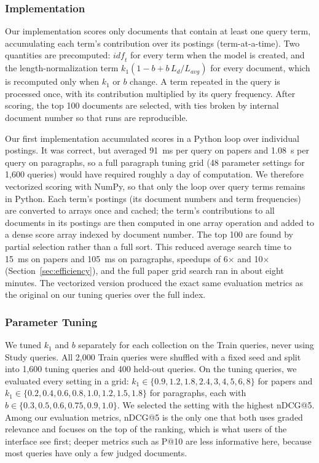 \documentclass[sigconf,nonacm]{acmart}
\begin{document}
\subsubsection{Implementation}
Our implementation scores only documents that contain at least one query term,
accumulating each term's contribution over its postings (term-at-a-time). Two
quantities are precomputed: $\mathit{idf}_t$ for every term when the model is 
created, and the length-normalization term $k_1(1 - b + b\,L_d/L_{\mathit{avg}})$
for every document, which is recomputed only when $k_1$ or $b$ change. A term 
repeated in the query is processed once, with its contribution multiplied by its 
query frequency. After scoring, the top 100 documents are selected, with ties broken
by internal document number so that runs are reproducible.

Our first implementation accumulated scores in a Python loop over individual postings. 
It was correct, but averaged 91~ms per query on papers and 1.08~s per query on paragraphs, 
so a full paragraph tuning grid (48 parameter settings for 1,600 queries) would have required
roughly a day of computation. We therefore vectorized scoring with NumPy, so that only the 
loop over query terms remains in Python. Each term's postings (its document numbers and term 
frequencies) are converted to arrays once and cached; the term's contributions to all documents 
in its postings are then computed in one array operation and added to a dense score array indexed 
by document number. The top 100 are found by partial selection rather than a full sort. This reduced 
average search time to 15~ms on papers and 105~ms on paragraphs, speedups of 6$\times$ and 10$\times$ 
(Section~\ref{sec:efficiency}), and the full paper grid search ran in about eight minutes. The 
vectorized version produced the exact same evaluation metrics as the original on our tuning queries 
over the full index.

\subsubsection{Parameter Tuning}
We tuned $k_1$ and $b$ separately for each collection on the Train queries, never using 
Study queries. All 2,000 Train queries were shuffled with a fixed seed and split into 
1,600 tuning queries and 400 held-out queries. On the tuning queries, we evaluated every 
setting in a grid:
$k_1 \in \{0.9, 1.2, 1.8, 2.4, 3, 4, 5, 6, 8\}$ for papers and 
$k_1 \in \{0.2, 0.4, 0.6, 0.8, 1.0, 1.2, 1.5, 1.8\}$ for paragraphs, each with
$b \in \{0.3, 0.5, 0.6, 0.75, 0.9, 1.0\}$. We selected the setting with the highest nDCG@5.
Among our evaluation metrics, nDCG@5 is the only one that both uses graded relevance and focuses
on the top of the ranking, which is what users of the interface see first; deeper metrics such as
P@10 are less informative here, because most queries have only a few judged documents.
\end{document}
